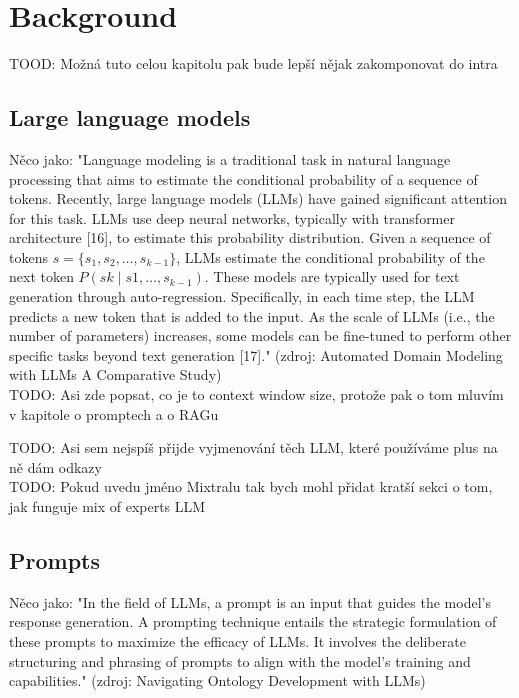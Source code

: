 \chapter{Background}

TOOD: Možná tuto celou kapitolu pak bude lepší nějak zakomponovat do intra

\section{Large language models}

Něco jako: "Language modeling is a traditional task in natural language processing that aims to estimate the conditional probability of a sequence of tokens. Recently, large language models (LLMs) have gained significant attention for this task. LLMs use deep neural networks, typically with transformer architecture [16], to estimate this probability distribution. Given a sequence of tokens $s = \{ s_1, s_2, \ldots, s_{k-1} \}$, LLMs estimate the conditional probability of the next token $P(sk \mid s1,\ldots, s_{k-1})$.
These models are typically used for text generation through auto-regression. Specifically, in each time step, the LLM predicts a new token that is added to the input. As the scale of LLMs (i.e., the number of parameters) increases, some models can be fine-tuned to perform other specific tasks beyond text generation [17]." (zdroj: Automated Domain Modeling with LLMs A Comparative Study) \\

TODO: Asi zde popsat, co je to context window size, protože pak o tom mluvím v kapitole o promptech a o RAGu

TODO: Asi sem nejspíš přijde vyjmenování těch LLM, které používáme plus na ně dám odkazy \\

TODO: Pokud uvedu jméno Mixtralu tak bych mohl přidat kratší sekci o tom, jak funguje mix of experts LLM \\


\section{Prompts}
Něco jako: "In the field of LLMs, a prompt is an input that guides the model’s response
 generation. A prompting technique entails the strategic formulation of these
 prompts to maximize the efficacy of LLMs. It involves the deliberate structuring
 and phrasing of prompts to align with the model’s training and capabilities." (zdroj: Navigating Ontology Development with LLMs) \\
